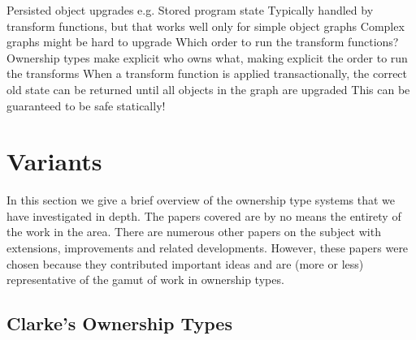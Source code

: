 \documentclass{acm_proc_article-sp}
\begin{document}
Persisted object upgrades e.g. Stored program state Typically handled by
transform functions, but that works well only for simple object graphs Complex
graphs might be hard to upgrade Which order to run the transform functions?
Ownership types make explicit who owns what, making explicit the order to run
the transforms When a transform function is applied transactionally, the
correct old state can be returned until all objects in the graph are upgraded
This can be guaranteed to be safe statically!




\section{Variants}
\label{sec:variants}

In this section we give a brief overview of the ownership type systems that we
have investigated in depth. The papers covered are by no means the entirety of
the work in the area. There are numerous other papers on the subject with
extensions, improvements and related developments. However, these papers were
chosen because they contributed important ideas and are (more or less)
representative of the gamut of work in ownership types.

\subsection{Clarke's Ownership Types}
\label{subsec:clarke}
\end{document}
